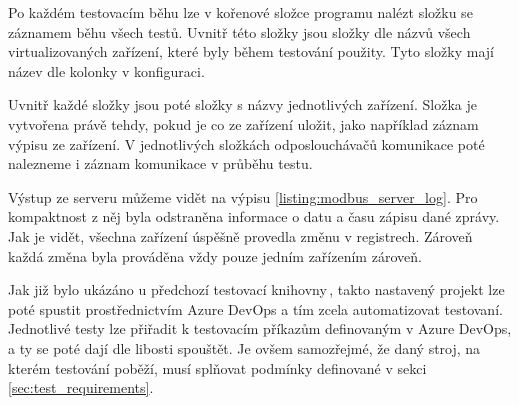 Po každém testovacím běhu lze v kořenové složce programu nalézt složku se záznamem běhu všech testů. Uvnitř této složky jsou složky dle názvů všech virtualizovaných zařízení, které byly během testování použity. Tyto složky mají název dle kolonky  v konfiguraci. 

Uvnitř každé složky jsou poté složky s názvy jednotlivých zařízení. Složka je vytvořena právě tehdy, pokud je co ze zařízení uložit, jako například záznam výpisu ze zařízení. V jednotlivých složkách odposlouchávačů komunikace poté nalezneme i záznam komunikace v průběhu testu. 

Výstup ze serveru můžeme vidět na výpisu \ref{listing:modbus_server_log}. Pro kompaktnost z něj byla odstraněna informace o datu a času zápisu dané zprávy. Jak je vidět, všechna zařízení úspěšně provedla změnu v registrech. Zároveň každá změna byla prováděna vždy pouze jedním zařízením zároveň.

Jak již bylo ukázáno u předchozí testovací knihovny\,\cite{bakalarka}, takto nastavený projekt lze poté spustit prostřednictvím Azure DevOps a tím zcela automatizovat testovaní. Jednotlivé testy lze přiřadit k testovacím příkazům definovaným v Azure DevOps, a ty se poté dají dle libosti spouštět. Je ovšem samozřejmé, že daný stroj, na kterém testování poběží, musí splňovat podmínky definované v sekci \ref{sec:test_requirements}.

